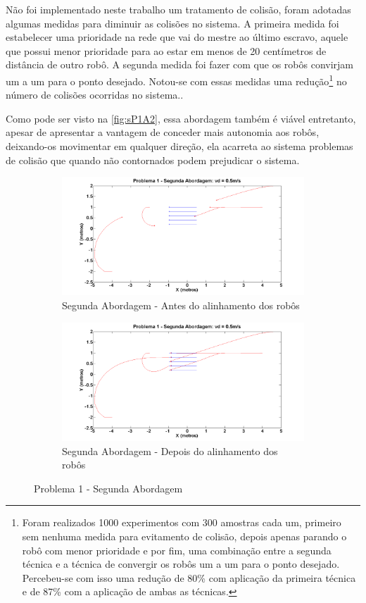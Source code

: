 Não foi implementado neste trabalho um tratamento de colisão, foram adotadas algumas medidas para diminuir as colisões no sistema. A primeira medida foi estabelecer uma prioridade na rede que vai do mestre ao último escravo, aquele que possui menor prioridade para ao estar em menos de 20 centímetros de distância de outro robô. A segunda medida foi fazer com que os robôs convirjam um a um para o ponto desejado. Notou-se com essas medidas uma redução\footnote{Foram realizados 1000 experimentos com 300 amostras cada um, primeiro sem nenhuma medida para evitamento de colisão, depois apenas parando o robô com menor prioridade e por fim, uma combinação entre a segunda técnica e a técnica de convergir os robôs um a um para o ponto desejado. Percebeu-se com isso uma redução de 80\% com aplicação da primeira técnica e de 87\% com a aplicação de ambas as técnicas.} no número de colisões ocorridas no sistema..

Como pode ser visto na \autoref{fig:sP1A2}, essa abordagem também é viável entretanto, apesar de apresentar a vantagem de conceder mais autonomia aos robôs, deixando-os movimentar em qualquer direção, ela acarreta ao sistema problemas de colisão que quando não contornados podem prejudicar o sistema.

\begin{figure}[!htb]
	\centering
	\begin{subfigure}{1.0\textwidth}
		\centering
		\includegraphics[width=.9\linewidth]{./04-figuras/Simulacoes/Problema1-Abordagem1/P1A2Inicio}
		\caption{Segunda Abordagem - Antes do alinhamento dos robôs}
		\label{fig:P1A2Ini}
	\end{subfigure}
	\begin{subfigure}{1.0\textwidth}
		\centering
		\includegraphics[width=.9\linewidth]{./04-figuras/Simulacoes/Problema1-Abordagem1/P1A2Fim}
		\caption{Segunda Abordagem - Depois do alinhamento dos robôs}
		\label{fig:P1A2Fim}
	\end{subfigure}
	\caption{Problema 1 - Segunda Abordagem}
	\label{fig:sP1A2}
\end{figure}

